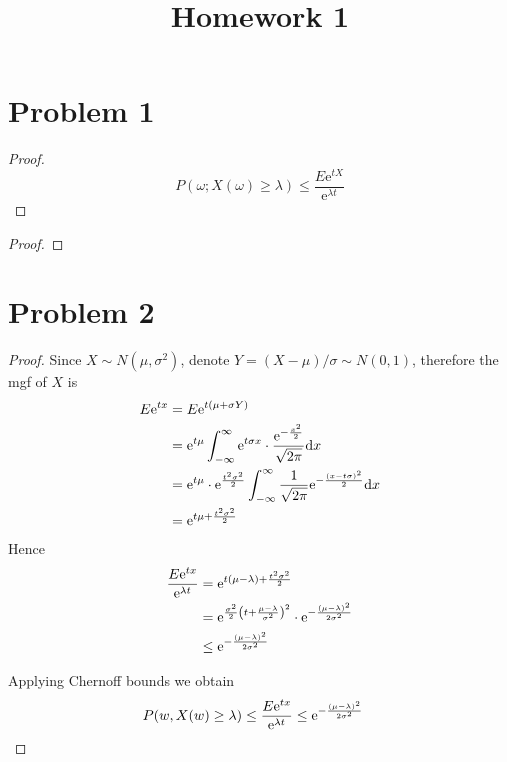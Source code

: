 \documentclass{homework}
\title{Homework 1}
\begin{document}
    \maketitle

    \section{Problem 1}
    \begin{subproblem}
        \item
        \begin{proof}
            \lipsum[1]
            \[P(\omega;X(\omega)\geq\lambda)\leq\frac{E\mathrm e^{tX}}{\mathrm e^{\lambda t}}\]

            \lipsum[2]
        \end{proof}

        \item
        \begin{proof}
            \lipsum[4-6]
        \end{proof}
    \end{subproblem}

    \section{Problem 2}
    \begin{proof}
        Since $X\sim N(\mu,\sigma^2)$,
        denote $Y=(X-\mu)/\sigma\sim N(0,1)$, therefore
        the mgf of $X$ is
        \begin{align*}
            E\mathrm e^{tx}&=E\mathrm e^{t(\mu+\sigma Y)}\\
                    &=\mathrm e^{t\mu}\int_{-\infty}^\infty\mathrm e^{t\sigma x}
                      \cdot\frac{\mathrm e^{-\frac{x^2}2}}{\sqrt{2\pi}}\mathrm d x\\
                    &=\mathrm e^{t\mu}\cdot\mathrm e^{\frac{t^2\sigma^2}{2}}\int_{-\infty}^{\infty}
                      \frac{1}{\sqrt{2\pi}}\mathrm e^{-\frac{(x-t\sigma)^2}{2}}
                      \mathrm d x\\
                    &=\mathrm e^{t\mu+\frac{t^2\sigma^2}{2}}
        \end{align*}
        Hence
        \begin{align*}
            \frac{E\mathrm e^{tx}}{\mathrm e^{\lambda t}}&=\mathrm e^{t(\mu-\lambda)+\frac{t^2\sigma^2}{2}}\\
            &=\mathrm e^{\frac{\sigma^2}{2}\left(t+\frac{\mu-\lambda}{\sigma^2}\right)^2}
              \cdot\mathrm e^{-\frac{(\mu-\lambda)^2}{2\sigma^2}}\\
            &\leq\mathrm e^{-\frac{(\mu-\lambda)^2}{2\sigma^2}}
        \end{align*}

        Applying Chernoff bounds we obtain
        \begin{align*}
            P(w,X(w)\geq\lambda)&\leq\frac{E\mathrm e^{tx}}{\mathrm e^{\lambda t}}
            \leq\mathrm e^{-\frac{(\mu-\lambda)^2}{2\sigma^2}}
        \end{align*}
    \end{proof}
\end{document}
